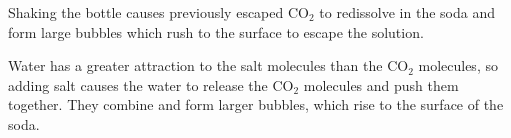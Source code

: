 \begin{multicols}{2}
\begin{description*}
{Shaking the bottle causes previously escaped CO$_2$ to redissolve in the soda and form large bubbles which rush to the surface to escape the solution.

Water has a greater attraction to the salt molecules than the CO$_2$ molecules, so adding salt causes the water to release the CO$_2$ molecules and push them together. They combine and form larger bubbles, which rise to the surface of the soda.}
\end{description*}



\end{multicols}

\pagebreak